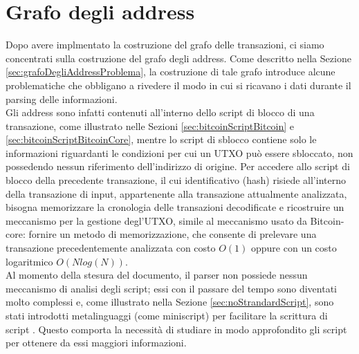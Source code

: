 \section{Grafo degli address} \label{sec:solGraphAddress}

Dopo avere implmentato la  costruzione del grafo delle transazioni, ci siamo concentrati sulla costruzione del grafo degli address. Come descritto nella Sezione \ref{sec:grafoDegliAddressProblema}, la costruzione di tale grafo introduce alcune problematiche che obbligano a rivedere il modo in cui si ricavano i dati durante il parsing delle informazioni.\\
Gli address sono infatti contenuti all'interno dello script di blocco di una transazione, come illustrato nelle Sezioni \ref{sec:bitcoinScriptBitcoin} e \ref{sec:bitcoinScriptBitcoinCore}, mentre lo script di sblocco contiene solo le informazioni riguardanti le condizioni per cui un UTXO può essere sbloccato, non possedendo nessun riferimento dell'indirizzo di origine.
Per accedere allo script di blocco della precedente transazione, il cui identificativo (hash) risiede all'interno della transazione di input, appartenente alla transazione attualmente analizzata, bisogna memorizzare la cronologia delle transazioni decodificate e ricostruire un meccanismo per la gestione degl'UTXO, simile al meccanismo usato da Bitcoin-core: fornire un metodo di memorizzazione, che consente di prelevare una transazione precedentemente analizzata con costo $O(1)$ oppure con un costo logaritmico $O(N log(N))$.\\
Al momento della stesura del documento, il parser non possiede nessun meccanismo di analisi degli script; essi con il passare del tempo sono diventati molto complessi e, come illustrato nella Sezione \ref{sec:noStrandardScript}, sono stati   introdotti metalinguaggi (come miniscript) per facilitare la scrittura di script . Questo comporta la necessità di studiare in modo approfondito gli script per ottenere da essi maggiori informazioni.

